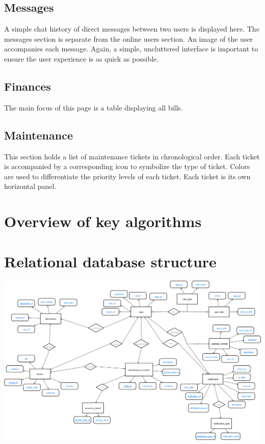 \documentclass[12pt]{article}
\begin{document}
\subsection{Messages}
A simple chat history of direct messages between two users is displayed here. The messages section is separate from the online users section. An image of the user accompanies each message. Again, a simple, uncluttered interface is important to ensure the user experience is as quick as possible.

\subsection{Finances}
The main focus of this page is a table displaying all bills.

\subsection{Maintenance}
This section holds a list of maintenance tickets in chronological order. Each ticket is accompanied by a corresponding icon to symbolize the type of ticket. Colors are used to differentiate the priority levels of each ticket. Each ticket is its own horizontal panel.

%
\section{Overview of key algorithms}

\clearpage
%
\section{Relational database structure}
\includegraphics[scale=0.397, angle=-90, keepaspectratio]{images/ER_Diagram.png}
%
\end{document}
